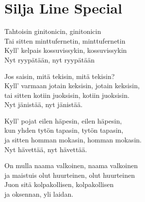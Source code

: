 \section{Silja Line Special}
Tahtoisin ginitonicin, ginitonicin\\
Tai sitten minttufernetin, minttufernetin\\
Kyll’ kelpais kossuvissykin, kossuvissykin\\
Nyt ryypätään, nyt ryypätään

Jos saisin, mitä tekisin, mitä tekisin?\\
Kyll’ varmaan jotain keksisin, jotain keksisin,\\
tai sitten kotiin juoksisin, kotiin juoksisin.\\
Nyt jänistää, nyt jänistää.

Kyll’ pojat eilen häpesin, eilen häpesin,\\
kun yhden tytön tapasin, tytön tapasin,\\
ja sitten homman mokasin, homman mokasin.\\
Nyt hävettää, nyt hävettää.

On mulla naama valkoinen, naama valkoinen\\
ja maistuis olut huurteinen, olut huurteinen\\
Juon sitä kolpakollisen, kolpakollisen\\
ja oksennan, yli laidan.
